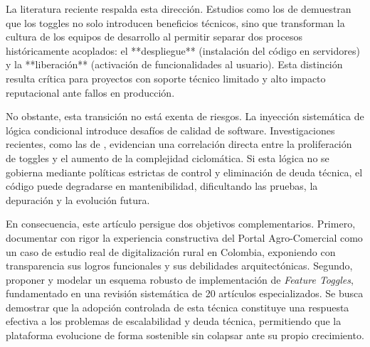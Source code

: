 La literatura reciente respalda esta dirección. Estudios como los de \cite{garcia2021practitioners} demuestran que los toggles no solo introducen beneficios técnicos, sino que transforman la cultura de los equipos de desarrollo al permitir separar dos procesos históricamente acoplados: el **despliegue** (instalación del código en servidores) y la **liberación** (activación de funcionalidades al usuario). Esta distinción resulta crítica para proyectos con soporte técnico limitado y alto impacto reputacional ante fallos en producción.

No obstante, esta transición no está exenta de riesgos. La inyección sistemática de lógica condicional introduce desafíos de calidad de software. Investigaciones recientes, como las de \cite{sharma2024complexity}, evidencian una correlación directa entre la proliferación de toggles y el aumento de la complejidad ciclomática. Si esta lógica no se gobierna mediante políticas estrictas de control y eliminación de deuda técnica, el código puede degradarse en mantenibilidad, dificultando las pruebas, la depuración y la evolución futura.

En consecuencia, este artículo persigue dos objetivos complementarios. Primero, documentar con rigor la experiencia constructiva del Portal Agro-Comercial como un caso de estudio real de digitalización rural en Colombia, exponiendo con transparencia sus logros funcionales y sus debilidades arquitectónicas. Segundo, proponer y modelar un esquema robusto de implementación de \textit{Feature Toggles}, fundamentado en una revisión sistemática de 20 artículos especializados. Se busca demostrar que la adopción controlada de esta técnica constituye una respuesta efectiva a los problemas de escalabilidad y deuda técnica, permitiendo que la plataforma evolucione de forma sostenible sin colapsar ante su propio crecimiento.
